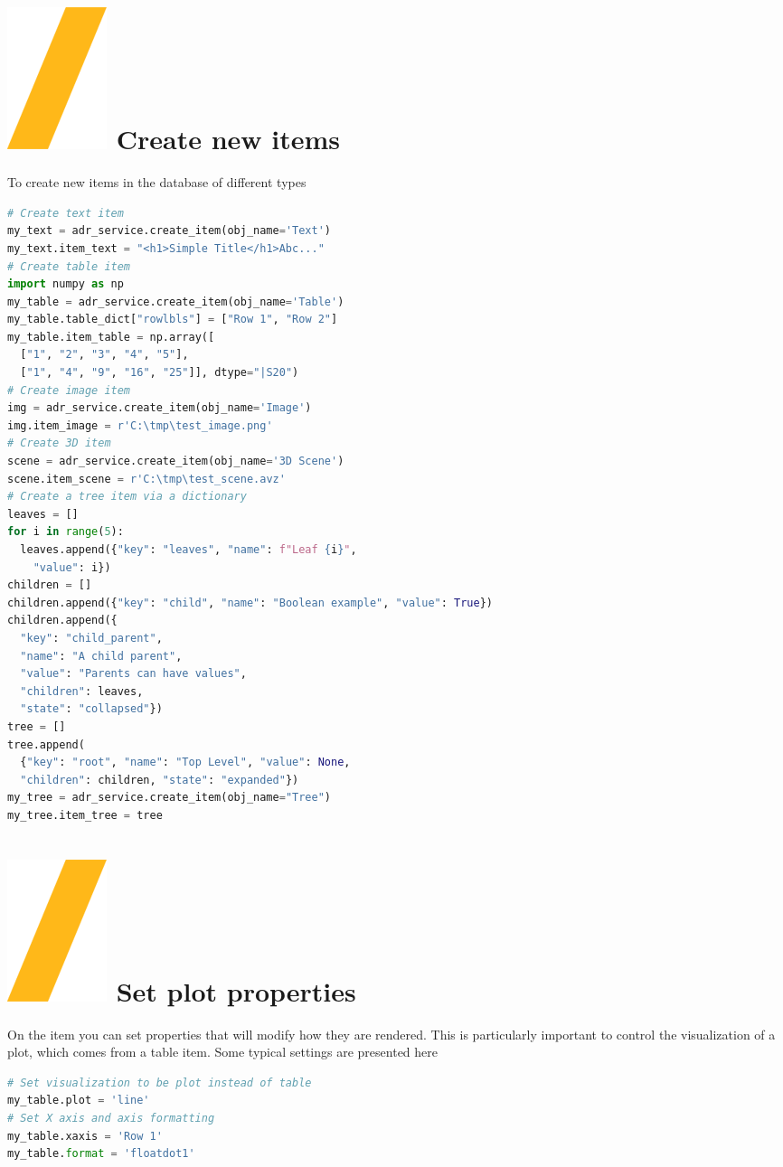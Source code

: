 \documentclass[9pt,landscape]{article}
\begin{document}
\begin{multicols}{3}
\section{\includegraphics[height=\fontcharht\font`\S]{slash.png}  Create new items}
To create new items in the database of different types
\begin{lstlisting}[language=Python]
# Create text item
my_text = adr_service.create_item(obj_name='Text')
my_text.item_text = "<h1>Simple Title</h1>Abc..."
# Create table item
import numpy as np
my_table = adr_service.create_item(obj_name='Table')
my_table.table_dict["rowlbls"] = ["Row 1", "Row 2"]
my_table.item_table = np.array([
  ["1", "2", "3", "4", "5"], 
  ["1", "4", "9", "16", "25"]], dtype="|S20")
# Create image item
img = adr_service.create_item(obj_name='Image')
img.item_image = r'C:\tmp\test_image.png'
# Create 3D item
scene = adr_service.create_item(obj_name='3D Scene')
scene.item_scene = r'C:\tmp\test_scene.avz'
# Create a tree item via a dictionary
leaves = []
for i in range(5):
  leaves.append({"key": "leaves", "name": f"Leaf {i}",
    "value": i})
children = []
children.append({"key": "child", "name": "Boolean example", "value": True})
children.append({
  "key": "child_parent", 
  "name": "A child parent", 
  "value": "Parents can have values", 
  "children": leaves,
  "state": "collapsed"})
tree = []
tree.append(
  {"key": "root", "name": "Top Level", "value": None, 
  "children": children, "state": "expanded"})
my_tree = adr_service.create_item(obj_name="Tree")
my_tree.item_tree = tree
\end{lstlisting} 


\section{\includegraphics[height=\fontcharht\font`\S]{slash.png}  Set plot properties}
On the item you can set properties that will modify how they are rendered. 
This is particularly important to control the visualization of a plot, which comes 
from a table item. Some typical settings are presented here
\begin{lstlisting}[language=Python]
# Set visualization to be plot instead of table
my_table.plot = 'line'
# Set X axis and axis formatting
my_table.xaxis = 'Row 1'
my_table.format = 'floatdot1'
\end{lstlisting} 


\end{multicols}
\end{document}
